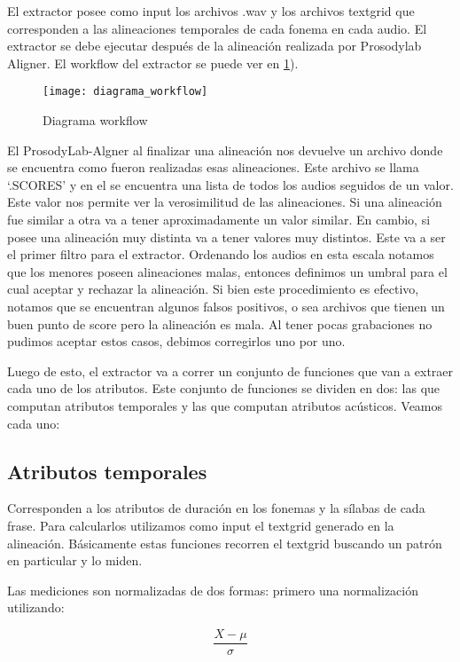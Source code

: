 El extractor posee como input los archivos .wav y los archivos textgrid que corresponden a las alineaciones temporales de cada fonema en cada audio. El extractor se debe ejecutar después de la alineación realizada por Prosodylab Aligner. El workflow del extractor se puede ver en \ref{workflow}). 

\begin{figure}[h!]
    \centerline{\texttt{[image: diagrama\_workflow]} }
    \caption{Diagrama workflow}
    \label{workflow}
\end{figure}

El ProsodyLab-Algner al finalizar una alineación nos devuelve un archivo donde se encuentra como fueron realizadas esas alineaciones. Este archivo se llama `.SCORES’ y en el se encuentra una lista de todos los audios seguidos de un valor. Este valor nos permite ver la verosimilitud de las alineaciones. Si una alineación fue similar a otra va a tener aproximadamente un valor similar. En cambio, si posee una alineación muy distinta va a tener valores muy distintos. Este va a ser el primer filtro para el extractor. Ordenando los audios en esta escala notamos que los menores poseen alineaciones malas, entonces definimos un umbral para el cual aceptar y rechazar la alineación. Si bien este procedimiento es efectivo, notamos que se encuentran algunos falsos positivos, o sea archivos que tienen un buen punto de score pero la alineación es mala. Al tener pocas grabaciones no pudimos aceptar estos casos, debimos corregirlos uno por uno.

Luego de esto, el extractor va a correr un conjunto de funciones que van a extraer cada uno de los atributos. Este conjunto de funciones se dividen en dos: las que computan atributos temporales y las que computan atributos acústicos. Veamos cada uno:

\subsection{Atributos temporales}

Corresponden a los atributos de duración en los fonemas y la sílabas de cada frase. Para calcularlos utilizamos como input el textgrid generado en la alineación. Básicamente estas funciones recorren el textgrid buscando un patrón en particular y lo miden.

Las mediciones son normalizadas de dos formas: primero una normalización utilizando:

\hspace{2cm} \[\frac{X - \mu }{ \sigma }\]

